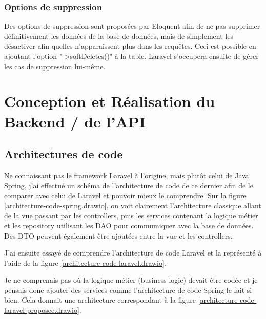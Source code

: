 \documentclass[
    iai, %
    il, %
]{heig-tb}
\begin{document}
\subsection{Options de suppression}
Des options de suppression sont proposées par Eloquent afin de ne pas supprimer définitivement les données de la base de données, mais de simplement les désactiver afin quelles n'apparaîssent plus dans les requêtes.\newline
Ceci est possible en ajoutant l'option "->softDeletes()" à la table.\newline
Laravel s'occupera ensuite de gérer les cas de suppression lui-même.

\chapter{Conception et Réalisation du Backend / de l'API}
\section{Architectures de code}

Ne connaissant pas le framework Laravel à l'origine, mais plutôt celui de Java Spring, j'ai effectué
un schéma de l'architecture de code de ce dernier afin de le comparer avec celui de Laravel et
pouvoir mieux le comprendre. Sur la figure \ref{architecture-code-spring.drawio}, on voit clairement
l'architecture classique allant de la vue passant par les controllers, puis les services contenant
la logique métier et les repository utilisant les DAO pour commumiquer avec la base de données. \\
Des DTO peuvent également être ajoutées entre la vue et les controllers.


J'ai ensuite essayé de comprendre l'architecture de code Laravel et la représenté à l'aide de la
figure \ref{architecture-code-laravel.drawio}.


Je ne comprenais pas où la logique métier (business logic) devait être codée et je pensais donc
ajouter des services comme l'architecture de code Spring le fait si bien. Cela donnait une
architecture correspondant à la figure \ref{architecture-code-laravel-proposee.drawio}.
\end{document}
